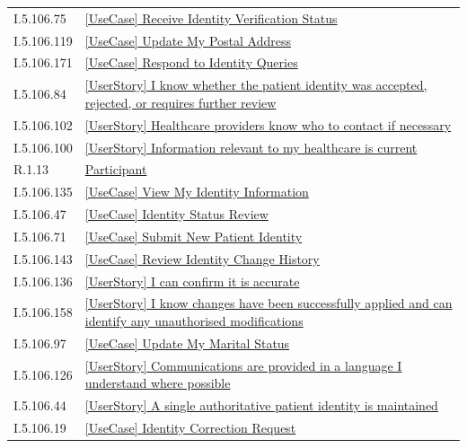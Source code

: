 \begin{longtable}{p{.22\linewidth}p{.73\linewidth}}
I.5.106.75 & \hyperref[element:99b65d02dd4445b58e139dcda7acd34b]{[UseCase] Receive Identity Verification Status} \\
I.5.106.119 & \hyperref[element:9d95470b86c94b9680ff2d270d31f2fa]{[UseCase] Update My Postal Address} \\
I.5.106.171 & \hyperref[element:9deef3a36a4641a5a2c6a6b7cf605bc3]{[UseCase] Respond to Identity Queries} \\
I.5.106.84 & \hyperref[element:a0a11bc2724049d99791327b6442ef3c]{[UserStory] I know whether the patient identity was accepted, rejected, or requires further review} \\
I.5.106.102 & \hyperref[element:a26c905873484451a6780d3a44f68a30]{[UserStory] Healthcare providers know who to contact if necessary} \\
I.5.106.100 & \hyperref[element:a34d5b97c391457ca72bf7d62dd364ab]{[UserStory] Information relevant to my healthcare is current} \\
R.1.13 & \hyperref[element:a3d1f5cc3e9b4d9eab326a5388445101]{Participant} \\
I.5.106.135 & \hyperref[element:a525fb85392c4b89a637b9849e2f5142]{[UseCase] View My Identity Information} \\
I.5.106.47 & \hyperref[element:abce996bda804b9ab4cc321dce0b7c3c]{[UseCase] Identity Status Review} \\
I.5.106.71 & \hyperref[element:ad078e422ca04457a4827c77fbc1fd52]{[UseCase] Submit New Patient Identity} \\
I.5.106.143 & \hyperref[element:ade99d9b916744adab76afc907628ac2]{[UseCase] Review Identity Change History} \\
I.5.106.136 & \hyperref[element:b248e7889f384900842f841320d0b1aa]{[UserStory] I can confirm it is accurate} \\
I.5.106.158 & \hyperref[element:b32e1ea56e03411babc42c0613eb4867]{[UserStory] I know changes have been successfully applied and can identify any unauthorised modifications} \\
I.5.106.97 & \hyperref[element:b4b4dd27a0fb415e94c1165cc3eb83e0]{[UseCase] Update My Marital Status} \\
I.5.106.126 & \hyperref[element:b4d45069c008473f943fdfcd0b3181b5]{[UserStory] Communications are provided in a language I understand where possible} \\
I.5.106.44 & \hyperref[element:b552d24911fd4a0689a7e8e1c0b703fe]{[UserStory] A single authoritative patient identity is maintained} \\
I.5.106.19 & \hyperref[element:b5ef9f55a1874af0a29ca814f9fa4d04]{[UseCase] Identity Correction Request} \\

\end{longtable}
